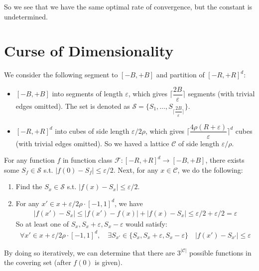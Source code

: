 \documentclass[11pt,a4paper]{ctexart}
\numberwithin{equation}{section}%
\begin{document}
So we see that we have the same optimal rate of convergence, but the constant is undetermined.
    









\section{Curse of Dimensionality}


We consider the following segment to $ [-B,+B] $ and partition of $ [-R,+R]^d $:
\begin{itemize}[topsep=2pt,itemsep=0pt]
    \item $ [-B,+B] $ into segments of length $ \varepsilon   $, which gives $ \lceil \dfrac{ 2B }{ \varepsilon  }\rceil $ segments (with trivial edges omitted). The set is denoted as $ \mathcal{S} = \{S_1,\ldots,S_{\lceil \dfrac{ 2B }{ \varepsilon  }\rceil }\} $.
    \item $ [-R,+R]^d $ into cubes of side length $ \varepsilon/2\rho   $, which gives $ \lceil \dfrac{ 4\rho (R+\varepsilon ) }{ \varepsilon  }\rceil ^d $ cubes (with trivial edges omitted). So we haved a lattice $ \mathcal{C} $ of side length $ \varepsilon/\rho   $.
\end{itemize}

For any function $ f $ in function class $ \mathcal{F}: [-R,+R]^d \rightarrow [-B,+B] $, there exists some $ S_f\in \mathcal{S} $ s.t. $ \left\vert f(0) - S_f  \right\vert \leq \varepsilon /2 $. Next, for any $ x\in \mathcal{C}$, we do the following:
\begin{enumerate}[topsep=2pt,itemsep=2pt]
    \item Find the $ S_x\in \mathcal{S} $ s.t. $ \left\vert f(x) - S_x  \right\vert \leq \varepsilon /2 $.
    \item For any $ x'\in x + \varepsilon/2\rho \cdot  [-1,1]^d $, we have 
    \begin{align*}
        \left\vert f(x')- S_x \right\vert \leq \left\vert f(x')- f(x) \right\vert + \left\vert f(x) - S_x \right\vert \leq \varepsilon/2 + \varepsilon /2 = \varepsilon 
    \end{align*}
    So at least one of $ S_x, S_x +\varepsilon , S_x - \varepsilon  $ would satisfy:
    \begin{align*}
        \forall x'\in x + \varepsilon/2\rho \cdot  [-1,1]^d,\quad \exists S_{x'}\in \{S_x, S_x +\varepsilon , S_x - \varepsilon  \} \quad \left\vert f(x')- S_{x'} \right\vert \leq \varepsilon
    \end{align*}
\end{enumerate}
    By doing so iteratively, we can determine that there are $ 3^{\left\vert \mathcal{C} \right\vert } $ possible functions in the covering set (after $ f(0) $ is given).
\end{document}
